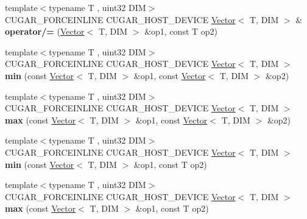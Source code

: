 \begin{DoxyCompactItemize}
\item 
\mbox{\label{namespacecugar_a81f3e3b770b08905365961db9d06a5d2}} 
{\footnotesize template$<$typename T , uint32 D\+IM$>$ }\\C\+U\+G\+A\+R\+\_\+\+F\+O\+R\+C\+E\+I\+N\+L\+I\+NE C\+U\+G\+A\+R\+\_\+\+H\+O\+S\+T\+\_\+\+D\+E\+V\+I\+CE \hyperlink{structcugar_1_1_vector}{Vector}$<$ T, D\+IM $>$ \& {\bfseries operator/=} (\hyperlink{structcugar_1_1_vector}{Vector}$<$ T, D\+IM $>$ \&op1, const T op2)
\item 
\mbox{\label{namespacecugar_a5c8f5a40182c9e3e4e9a44b053ae7a4d}} 
{\footnotesize template$<$typename T , uint32 D\+IM$>$ }\\C\+U\+G\+A\+R\+\_\+\+F\+O\+R\+C\+E\+I\+N\+L\+I\+NE C\+U\+G\+A\+R\+\_\+\+H\+O\+S\+T\+\_\+\+D\+E\+V\+I\+CE \hyperlink{structcugar_1_1_vector}{Vector}$<$ T, D\+IM $>$ {\bfseries min} (const \hyperlink{structcugar_1_1_vector}{Vector}$<$ T, D\+IM $>$ \&op1, const \hyperlink{structcugar_1_1_vector}{Vector}$<$ T, D\+IM $>$ \&op2)
\item 
\mbox{\label{namespacecugar_a8b3d6fbee48cb5ddd48d9ecffa581298}} 
{\footnotesize template$<$typename T , uint32 D\+IM$>$ }\\C\+U\+G\+A\+R\+\_\+\+F\+O\+R\+C\+E\+I\+N\+L\+I\+NE C\+U\+G\+A\+R\+\_\+\+H\+O\+S\+T\+\_\+\+D\+E\+V\+I\+CE \hyperlink{structcugar_1_1_vector}{Vector}$<$ T, D\+IM $>$ {\bfseries max} (const \hyperlink{structcugar_1_1_vector}{Vector}$<$ T, D\+IM $>$ \&op1, const \hyperlink{structcugar_1_1_vector}{Vector}$<$ T, D\+IM $>$ \&op2)
\item 
\mbox{\label{namespacecugar_a40268ce33d5628ba3fdaf33bb0569558}} 
{\footnotesize template$<$typename T , uint32 D\+IM$>$ }\\C\+U\+G\+A\+R\+\_\+\+F\+O\+R\+C\+E\+I\+N\+L\+I\+NE C\+U\+G\+A\+R\+\_\+\+H\+O\+S\+T\+\_\+\+D\+E\+V\+I\+CE \hyperlink{structcugar_1_1_vector}{Vector}$<$ T, D\+IM $>$ {\bfseries min} (const \hyperlink{structcugar_1_1_vector}{Vector}$<$ T, D\+IM $>$ \&op1, const T op2)
\item 
\mbox{\label{namespacecugar_a67e2da6c03250ffc843efc1e04e48ed1}} 
{\footnotesize template$<$typename T , uint32 D\+IM$>$ }\\C\+U\+G\+A\+R\+\_\+\+F\+O\+R\+C\+E\+I\+N\+L\+I\+NE C\+U\+G\+A\+R\+\_\+\+H\+O\+S\+T\+\_\+\+D\+E\+V\+I\+CE \hyperlink{structcugar_1_1_vector}{Vector}$<$ T, D\+IM $>$ {\bfseries max} (const \hyperlink{structcugar_1_1_vector}{Vector}$<$ T, D\+IM $>$ \&op1, const T op2)

\end{DoxyCompactItemize}
